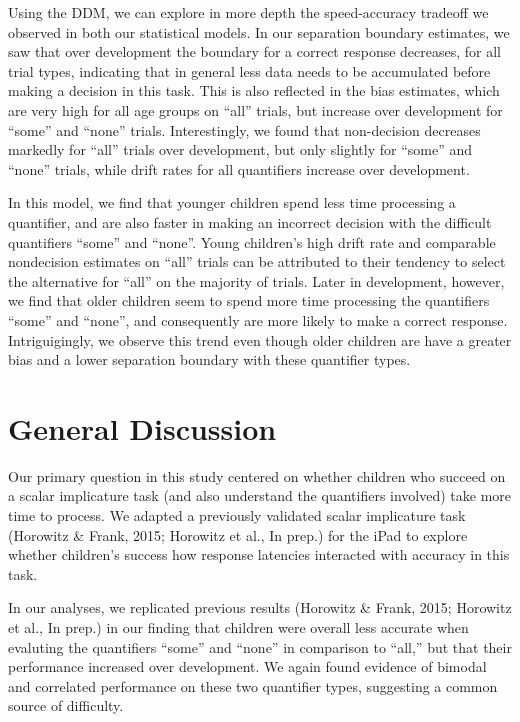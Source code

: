 \documentclass[10pt, letterpaper]{article}
\begin{document}
Using the DDM, we can explore in more depth the speed-accuracy tradeoff
we observed in both our statistical models. In our separation boundary
estimates, we saw that over development the boundary for a correct
response decreases, for all trial types, indicating that in general less
data needs to be accumulated before making a decision in this task. This
is also reflected in the bias estimates, which are very high for all age
groups on ``all'' trials, but increase over development for ``some'' and
``none'' trials. Interestingly, we found that non-decision decreases
markedly for ``all'' trials over development, but only slightly for
``some'' and ``none'' trials, while drift rates for all quantifiers
increase over development.

In this model, we find that younger children spend less time processing
a quantifier, and are also faster in making an incorrect decision with
the difficult quantifiers ``some'' and ``none''. Young children's high
drift rate and comparable nondecision estimates on ``all'' trials can be
attributed to their tendency to select the alternative for ``all'' on
the majority of trials. Later in development, however, we find that
older children seem to spend more time processing the quantifiers
``some'' and ``none'', and consequently are more likely to make a
correct response. Intriguigingly, we observe this trend even though
older children are have a greater bias and a lower separation boundary
with these quantifier types.

\section{General Discussion}\label{general-discussion}

Our primary question in this study centered on whether children who
succeed on a scalar implicature task (and also understand the
quantifiers involved) take more time to process. We adapted a previously
validated scalar implicature task (Horowitz \& Frank, 2015; Horowitz et
al., In prep.) for the iPad to explore whether children's success how
response latencies interacted with accuracy in this task.

In our analyses, we replicated previous results (Horowitz \& Frank,
2015; Horowitz et al., In prep.) in our finding that children were
overall less accurate when evaluting the quantifiers ``some'' and
``none'' in comparison to ``all,'' but that their performance increased
over development. We again found evidence of bimodal and correlated
performance on these two quantifier types, suggesting a common source of
difficulty.
\end{document}
